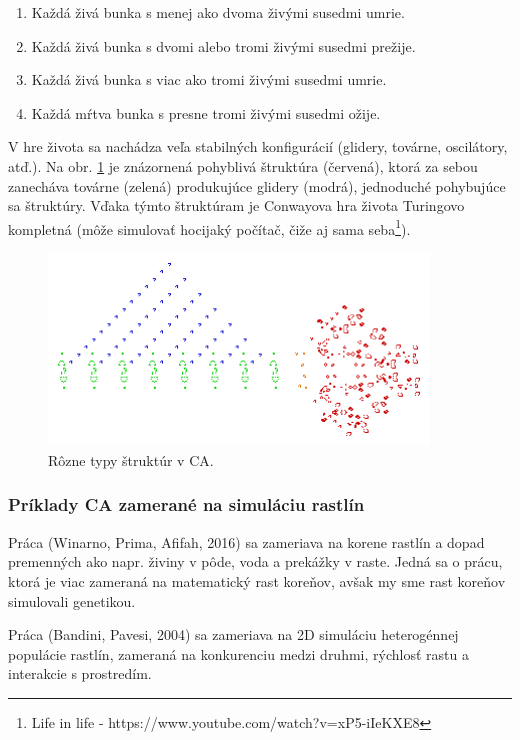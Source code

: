 \documentclass[12pt]{article}
\begin{document}
\begin{enumerate}
	\item Každá živá bunka s menej ako dvoma živými susedmi umrie.
	\item Každá živá bunka s dvomi alebo tromi živými susedmi prežije.
	\item Každá živá bunka s viac ako tromi živými susedmi umrie.
	\item Každá mŕtva bunka s presne tromi živými susedmi ožije.
\end{enumerate}

V hre života sa nachádza veľa stabilných konfigurácií (glidery, továrne,
oscilátory, atď.). Na obr. \ref{obr:conwayova hra zivota} je znázornená
pohyblivá štruktúra (červená), ktorá
za sebou zanecháva továrne (zelená) produkujúce glidery (modrá),
jednoduché pohybujúce sa štruktúry.
Vďaka týmto štruktúram je Conwayova hra života Turingovo kompletná (môže
simulovať hocijaký počítač, čiže aj sama seba\footnote
{Life in life - https://www.youtube.com/watch?v=xP5-iIeKXE8}).

\begin{figure}[ht]
	\centering
	\includegraphics[width=0.9\textwidth]{res/Conways_game_of_life_breeder.png}
	\caption{Rôzne typy štruktúr v CA.}
	\label{obr:conwayova hra zivota}
\end{figure}

\subsubsection{Príklady CA zamerané na simuláciu rastlín}

Práca (Winarno, Prima, Afifah, 2016) sa zameriava na
korene rastlín a dopad premenných ako napr. živiny v pôde, voda a prekážky
v raste. Jedná sa o prácu, ktorá je viac zameraná na matematický rast koreňov,
avšak my sme rast koreňov simulovali genetikou.

Práca (Bandini, Pavesi, 2004) sa zameriava na 2D simuláciu heterogénnej populácie
rastlín, zameraná na konkurenciu medzi druhmi, rýchlosť rastu a interakcie
s prostredím.
\end{document}

